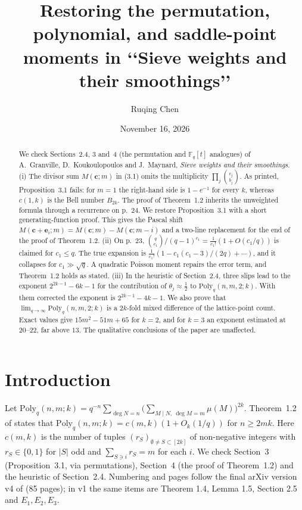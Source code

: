 \documentclass[11pt,a4paper]{amsart}
\title[Permutation, polynomial and saddle-point moments]{Restoring the permutation, polynomial,
and saddle-point moments in \texorpdfstring{\lq\lq Sieve weights and their smoothings\rq\rq}{"Sieve weights and their smoothings"}}
\author{Ruqing Chen}
\date{November 16, 2026}
\theoremstyle{remark}
\newcommand{\bc}{\mathbf c}
\begin{document}
\begin{abstract}
We check Sections~2.4, 3 and~4 (the permutation and $\mathbb F_q[t]$ analogues) of A.~Granville,
D.~Koukoulopoulos and J.~Maynard, \emph{Sieve weights and their smoothings}.
(i) The divisor sum $M(\bc;m)$ in (3.1) omits the multiplicity $\prod_j\binom{c_j}{b_j}$. As printed,
Proposition~3.1 fails: for $m=1$ the right-hand side is $1-e^{-1}$ for every $k$, whereas $c(1,k)$ is the
Bell number $B_{2k}$. The proof of Theorem~1.2 inherits the unweighted formula through a recurrence on
p.~24. We restore Proposition~3.1 with a short generating-function proof. This gives the Pascal shift
$M(\bc+\mathbf e_i;m)=M(\bc;m)-M(\bc;m-i)$ and a two-line replacement for the end of the proof of
Theorem~1.2. (ii) On p.~23, $\binom{q}{c_1}/(q-1)^{c_1}=\frac1{c_1!}(1+O(c_1/q))$ is claimed for
$c_1\le q$. The true expansion is $\frac1{c_1!}(1-c_1(c_1-3)/(2q)+\cdots)$, and it collapses for
$c_1\gg\sqrt q$. A quadratic Poisson moment repairs the error term, and Theorem~1.2 holds as stated.
(iii) In the heuristic of Section~2.4, three slips lead to the exponent $2^{2k-1}-6k-1$ for the
contribution of $\theta_j\approx\frac12$ to $\mathrm{Poly}_q(n,m,2;k)$. With them corrected the exponent
is $2^{2k-1}-4k-1$. We also prove that $\lim_{q\to\infty}\mathrm{Poly}_q(n,m,2;k)$ is a $2k$-fold mixed
difference of the lattice-point count. Exact values give $15m^2-51m+65$ for $k=2$, and for $k=3$ an
exponent estimated at $20$--$22$, far above $13$. The qualitative conclusions of the paper are unaffected.
\end{abstract}
\maketitle

\section{Introduction}

Let $\mathrm{Poly}_q(n,m;k)=q^{-n}\sum_{\deg N=n}\bigl(\sum_{M\mid N,\ \deg M=m}\mu(M)\bigr)^{2k}$. Theorem~1.2
of \cite{GKM} states that $\mathrm{Poly}_q(n,m;k)=c(m,k)(1+O_k(1/q))$ for $n\ge2mk$. Here $c(m,k)$ is the
number of tuples $(r_S)_{\emptyset\ne S\subset[2k]}$ of non-negative integers with $r_S\in\{0,1\}$ for $|S|$
odd and $\sum_{S\ni i}r_S=m$ for each $i$. We check Section~3 (Proposition~3.1, via permutations), Section~4
(the proof of Theorem~1.2) and the heuristic of Section~2.4.
Numbering and pages follow the final arXiv version v4 of \cite{GKM} (85 pages); in v1 the same items
are Theorem 1.4, Lemma 1.5, Section 2.5 and $E_1,E_2,E_3$.
\end{document}

